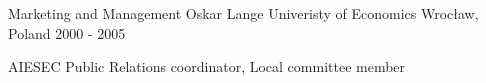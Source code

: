 

\begin{cventries}

  \cventry
    {Marketing and Management} %
    {Oskar Lange Univeristy of Economics} %
    {Wrocław, Poland} %
    {2000 - 2005} %
    {
      \begin{cvitems} %
        \item {AIESEC Public Relations coordinator, Local committee member}
      \end{cvitems}
    }

\end{cventries}
